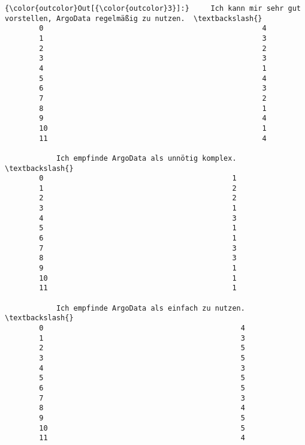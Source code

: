 \documentclass[11pt]{article}
\begin{document}
\begin{Verbatim}[commandchars=\\\{\}]
{\color{outcolor}Out[{\color{outcolor}3}]:}     Ich kann mir sehr gut vorstellen, ArgoData regelmäßig zu nutzen.  \textbackslash{}
        0                                                   4                  
        1                                                   3                  
        2                                                   2                  
        3                                                   3                  
        4                                                   1                  
        5                                                   4                  
        6                                                   3                  
        7                                                   2                  
        8                                                   1                  
        9                                                   4                  
        10                                                  1                  
        11                                                  4                  
        
            Ich empfinde ArgoData als unnötig komplex.  \textbackslash{}
        0                                            1   
        1                                            2   
        2                                            2   
        3                                            1   
        4                                            3   
        5                                            1   
        6                                            1   
        7                                            3   
        8                                            3   
        9                                            1   
        10                                           1   
        11                                           1   
        
            Ich empfinde ArgoData als einfach zu nutzen.  \textbackslash{}
        0                                              4   
        1                                              3   
        2                                              5   
        3                                              5   
        4                                              3   
        5                                              5   
        6                                              5   
        7                                              3   
        8                                              4   
        9                                              5   
        10                                             5   
        11                                             4   
        

\end{Verbatim}
\end{document}
